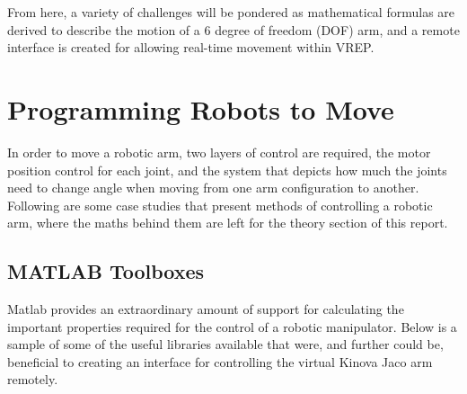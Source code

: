 \documentclass[12pt,openany,a4paper]{book}
\begin{document}
From here, a variety of challenges will be pondered as mathematical formulas are derived to describe the motion of a 6 degree of freedom (DOF) arm, and a remote interface is created for allowing real-time movement within VREP.\\

%
%
\chapter{Programming Robots to Move}
In order to move a robotic arm, two layers of control are required, the motor position control for each joint, and the system that depicts how much the joints need to change angle when moving from one arm configuration to another. Following are some case studies that present methods of controlling a robotic arm, where the maths behind them are left for the theory section of this report.

\section{MATLAB Toolboxes}
Matlab provides an extraordinary amount of support for calculating the important properties required for the control of a robotic manipulator. Below is a sample of some of the useful libraries available that were, and further could be, beneficial to creating an interface for controlling the virtual Kinova Jaco arm remotely.
\end{document}
